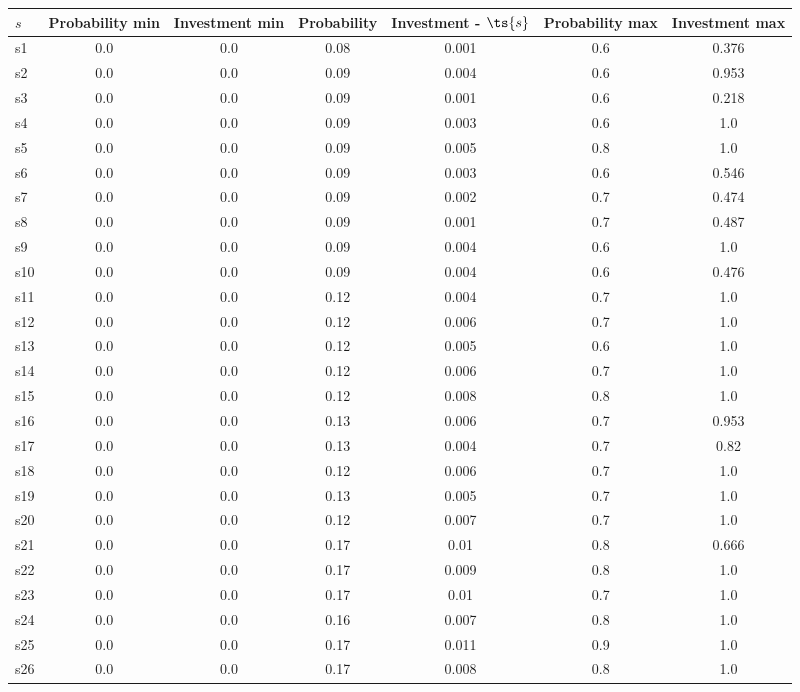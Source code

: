 \documentclass{article}
\begin{document}
\noindent\begin{tabular}{|l|c|c|c|c|c|c|}
\hline
$s$& Probability min & Investment min & Probability & Investment - $\ts{s}$ & Probability max & Investment max\\
\hline
s1 &0.0 & 0.0 & 0.08 & 0.001 & 0.6 & 0.376\\
\hline
s2 &0.0 & 0.0 & 0.09 & 0.004 & 0.6 & 0.953\\
\hline
s3 &0.0 & 0.0 & 0.09 & 0.001 & 0.6 & 0.218\\
\hline
s4 &0.0 & 0.0 & 0.09 & 0.003 & 0.6 & 1.0\\
\hline
s5 &0.0 & 0.0 & 0.09 & 0.005 & 0.8 & 1.0\\
\hline
s6 &0.0 & 0.0 & 0.09 & 0.003 & 0.6 & 0.546\\
\hline
s7 &0.0 & 0.0 & 0.09 & 0.002 & 0.7 & 0.474\\
\hline
s8 &0.0 & 0.0 & 0.09 & 0.001 & 0.7 & 0.487\\
\hline
s9 &0.0 & 0.0 & 0.09 & 0.004 & 0.6 & 1.0\\
\hline
s10 &0.0 & 0.0 & 0.09 & 0.004 & 0.6 & 0.476\\
\hline
s11 &0.0 & 0.0 & 0.12 & 0.004 & 0.7 & 1.0\\
\hline
s12 &0.0 & 0.0 & 0.12 & 0.006 & 0.7 & 1.0\\
\hline
s13 &0.0 & 0.0 & 0.12 & 0.005 & 0.6 & 1.0\\
\hline
s14 &0.0 & 0.0 & 0.12 & 0.006 & 0.7 & 1.0\\
\hline
s15 &0.0 & 0.0 & 0.12 & 0.008 & 0.8 & 1.0\\
\hline
s16 &0.0 & 0.0 & 0.13 & 0.006 & 0.7 & 0.953\\
\hline
s17 &0.0 & 0.0 & 0.13 & 0.004 & 0.7 & 0.82\\
\hline
s18 &0.0 & 0.0 & 0.12 & 0.006 & 0.7 & 1.0\\
\hline
s19 &0.0 & 0.0 & 0.13 & 0.005 & 0.7 & 1.0\\
\hline
s20 &0.0 & 0.0 & 0.12 & 0.007 & 0.7 & 1.0\\
\hline
s21 &0.0 & 0.0 & 0.17 & 0.01 & 0.8 & 0.666\\
\hline
s22 &0.0 & 0.0 & 0.17 & 0.009 & 0.8 & 1.0\\
\hline
s23 &0.0 & 0.0 & 0.17 & 0.01 & 0.7 & 1.0\\
\hline
s24 &0.0 & 0.0 & 0.16 & 0.007 & 0.8 & 1.0\\
\hline
s25 &0.0 & 0.0 & 0.17 & 0.011 & 0.9 & 1.0\\
\hline
s26 &0.0 & 0.0 & 0.17 & 0.008 & 0.8 & 1.0\\

\end{tabular}
\end{document}
